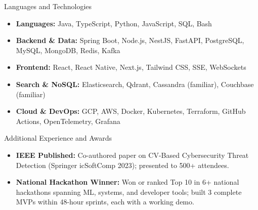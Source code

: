 \documentclass[]{mcdowellcv}
\begin{document}
\begin{cvsection}{Languages and Technologies}
  \begin{cvsubsection}{}{}{}
    \begin{itemize}
      \item \textbf{Languages:} Java, TypeScript, Python, JavaScript, SQL, Bash
      \item \textbf{Backend \& Data:} Spring Boot, Node.js, NestJS, FastAPI, PostgreSQL, MySQL, MongoDB, Redis, Kafka
      \item \textbf{Frontend:} React, React Native, Next.js, Tailwind CSS, SSE, WebSockets
      \item \textbf{Search \& NoSQL:} Elasticsearch, Qdrant, Cassandra (familiar), Couchbase (familiar)
      \item \textbf{Cloud \& DevOps:} GCP, AWS, Docker, Kubernetes, Terraform, GitHub Actions, OpenTelemetry, Grafana
    \end{itemize}
  \end{cvsubsection}
\end{cvsection}

\begin{cvsection}{Additional Experience and Awards}
  \begin{cvsubsection}{}{}{}
    \begin{itemize}
      \item \textbf{IEEE Published:} Co-authored paper on CV-Based Cybersecurity Threat Detection (Springer icSoftComp 2023); presented to 500+ attendees.
      \item \textbf{National Hackathon Winner:} Won or ranked Top 10 in 6+ national hackathons spanning ML, systems, and developer tools; built 3 complete MVPs within 48-hour sprints, each with a working demo.
    \end{itemize}
  \end{cvsubsection}
\end{cvsection}
\end{document}
